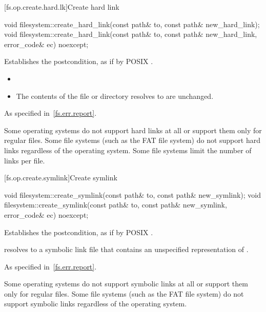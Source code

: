 [fs.op.create.hard.lk]{Create hard link}

%
\begin{itemdecl}
void filesystem::create_hard_link(const path& to, const path& new_hard_link);
void filesystem::create_hard_link(const path& to, const path& new_hard_link,
                                      error_code& ec) noexcept;
\end{itemdecl}

\begin{itemdescr}
\pnum
\effects
Establishes the postcondition, as if by POSIX .

\pnum
\ensures
\begin{itemize}
\item {}
\item The contents of the file or directory
     resolves to are unchanged.
\end{itemize}

\pnum
\throws
As specified in~\ref{fs.err.report}.

\pnum
\begin{note}
Some operating systems do not support hard links at all or support
  them only for regular files. Some file systems (such as the FAT file system)
  do not support hard links regardless of the operating system.
  Some file systems limit the number of links per file.
\end{note}
\end{itemdescr}

[fs.op.create.symlink]{Create symlink}

%
\begin{itemdecl}
void filesystem::create_symlink(const path& to, const path& new_symlink);
void filesystem::create_symlink(const path& to, const path& new_symlink,
                    error_code& ec) noexcept;
\end{itemdecl}

\begin{itemdescr}
\pnum
\effects
Establishes the postcondition, as if by POSIX .

\pnum
\ensures
{} resolves to a symbolic link file that
  contains an unspecified representation of .

\pnum
\throws
As specified in~\ref{fs.err.report}.

\pnum
\begin{note}
Some operating systems do not support symbolic links at all or support
  them only for regular files.
  Some file systems (such as the FAT file system) do not
  support symbolic links regardless of the operating system.
\end{note}
\end{itemdescr}

